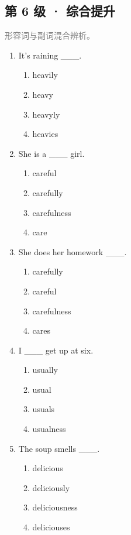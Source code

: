 \documentclass[11pt,a4paper]{ctexart}
\begin{document}
\subsection*{第 6 级 · 综合提升}
\noindent\textcolor{gray}{形容词与副词混合辨析。}\par\smallskip
\begin{enumerate}[leftmargin=*,itemsep=4pt]
\item It’s raining \_\_\_.
\begin{enumerate}[label=\Alph*.,leftmargin=2em,itemsep=1pt,topsep=2pt]
\item heavily
\item heavy
\item heavyly
\item heavies
\end{enumerate}
\item She is a \_\_\_ girl.
\begin{enumerate}[label=\Alph*.,leftmargin=2em,itemsep=1pt,topsep=2pt]
\item careful
\item carefully
\item carefulness
\item care
\end{enumerate}
\item She does her homework \_\_\_.
\begin{enumerate}[label=\Alph*.,leftmargin=2em,itemsep=1pt,topsep=2pt]
\item carefully
\item careful
\item carefulness
\item cares
\end{enumerate}
\item I \_\_\_ get up at six.
\begin{enumerate}[label=\Alph*.,leftmargin=2em,itemsep=1pt,topsep=2pt]
\item usually
\item usual
\item usuals
\item usualness
\end{enumerate}
\item The soup smells \_\_\_.
\begin{enumerate}[label=\Alph*.,leftmargin=2em,itemsep=1pt,topsep=2pt]
\item delicious
\item deliciously
\item deliciousness
\item deliciouses

\end{enumerate}
\end{enumerate}
\end{document}
